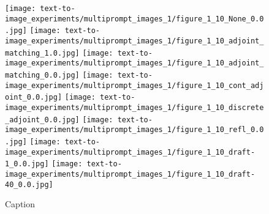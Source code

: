 \documentclass[]{fairmeta}
\begin{document}
\begin{figure}
    \centering
    \texttt{[image: text-to-image\_experiments/multiprompt\_images\_1/figure\_1\_10\_None\_0.0.jpg]}
    \texttt{[image: text-to-image\_experiments/multiprompt\_images\_1/figure\_1\_10\_adjoint\_matching\_1.0.jpg]}
    \texttt{[image: text-to-image\_experiments/multiprompt\_images\_1/figure\_1\_10\_adjoint\_matching\_0.0.jpg]}
    \texttt{[image: text-to-image\_experiments/multiprompt\_images\_1/figure\_1\_10\_cont\_adjoint\_0.0.jpg]}
    \texttt{[image: text-to-image\_experiments/multiprompt\_images\_1/figure\_1\_10\_discrete\_adjoint\_0.0.jpg]}
    \texttt{[image: text-to-image\_experiments/multiprompt\_images\_1/figure\_1\_10\_refl\_0.0.jpg]}
    \texttt{[image: text-to-image\_experiments/multiprompt\_images\_1/figure\_1\_10\_draft-1\_0.0.jpg]}
    \texttt{[image: text-to-image\_experiments/multiprompt\_images\_1/figure\_1\_10\_draft-40\_0.0.jpg]}
    \caption{Caption}
    \label{fig:enter-label}
\end{figure}


\end{document}
